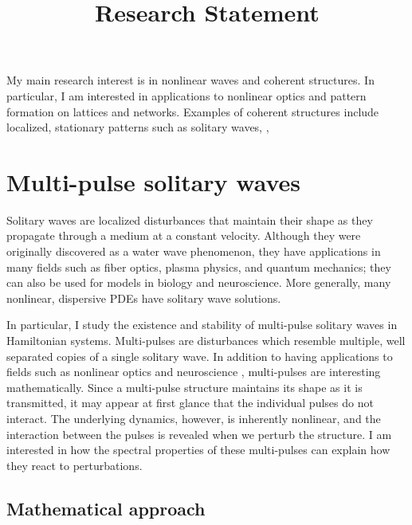 \documentclass[12pt,reqno,oneside]{article}
\title{Research Statement}
\date{\vspace{-12ex}}
\theoremstyle{definition}
\theoremstyle{remark}
\begin{document}
\thispagestyle{empty}

\maketitle

My main research interest is in nonlinear waves and coherent structures. In particular, I am interested in applications to nonlinear optics and pattern formation on lattices and networks. Examples of coherent structures include localized, stationary patterns such as solitary waves,  , 



\section{Multi-pulse solitary waves}

Solitary waves are localized disturbances that maintain their shape as they propagate through a medium at a constant velocity. Although they were originally discovered as a water wave phenomenon, they have applications in many fields such as fiber optics, plasma physics, and quantum mechanics; they can also be used for models in biology and neuroscience. More generally, many nonlinear, dispersive PDEs have solitary wave solutions.

In particular, I study the existence and stability of multi-pulse solitary waves in Hamiltonian systems. Multi-pulses are disturbances which resemble multiple, well separated copies of a single solitary wave. In addition to having applications to fields such as nonlinear optics and neuroscience \cite{Evans1982}, multi-pulses are interesting mathematically. Since a multi-pulse structure maintains its shape as it is transmitted, it may appear at first glance that the individual pulses do not interact. The underlying dynamics, however, is inherently nonlinear, and the interaction between the pulses is revealed when we perturb the structure. I am interested in how the spectral properties of these multi-pulses can explain how they react to perturbations.

\subsection{Mathematical approach}
\end{document}
